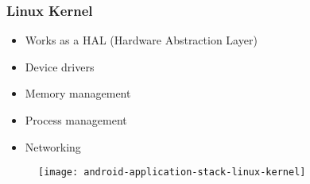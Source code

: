 %
%


\begin{frame}
  \frametitle{Linux Kernel}
  
  \begin{itemize}
  \item<1-> Works as a HAL (Hardware Abstraction Layer)
  \item<2-> Device drivers
  \item<3-> Memory management
  \item<4-> Process management
  \item<5-> Networking
  \end{itemize}

  \begin{figure}
    \centering
    \texttt{[image: android-application-stack-linux-kernel]}
  \end{figure}


\end{frame}


